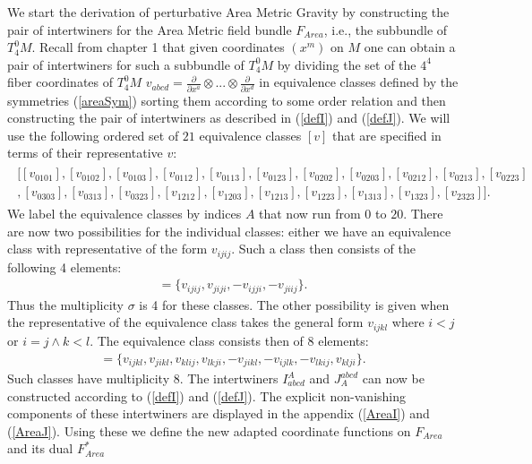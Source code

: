 \documentclass[a4paper,12pt, DIV=14, BCOR=5mm, twoside, headsepline, numbers=noenddot]{scrbook}
\begin{document}
We start the derivation of perturbative Area Metric Gravity by constructing the pair of intertwiners for the Area Metric field bundle $F_{Area}$, i.e., the subbundle of $T^0_4M$. Recall from chapter 1 that given coordinates $(x^m)$ on $M$ one can obtain a pair of intertwiners for such a subbundle of $T^0_4M$ by dividing the set of the $4^4$ fiber coordinates of $T^0_4M$ $v_{abcd}=\frac{\partial}{\partial x^a} \otimes ... \otimes \frac{\partial}{\partial x^d}$ in equivalence classes defined by the symmetries (\ref{areaSym}) sorting them according to some order relation and then constructing the pair of intertwiners as described in (\ref{defI}) and (\ref{defJ}). We will use the following ordered set of $21$ equivalence classes $[v]$ that are specified in terms of their representative $v$:
\begin{align}
\begin{aligned}
    \bigl [ [v_{0101}], [v_{0102}], [v_{0103}], [v_{0112}], [v_{0113}], [v_{0123}], [v_{0202}], [v_{0203}], [v_{0212}], [v_{0213}], [v_{0223}]\\
    , [v_{0303}], [v_{0313}], [v_{0323}], [v_{1212}], [v_{1203}], [v_{1213}], [v_{1223}], [v_{1313}], [v_{1323}], [v_{2323}]  \bigr ].
\end{aligned}
\end{align}
We label the equivalence classes by indices $A$ that now run from $0$ to $20$.
There are now two possibilities for the individual classes: either we have an equivalence class with representative of the form $v_{ijij}$. Such a class then consists of the following 4 elements:
\begin{align}
    [v_{ijij}] = \{ v_{ijij}, v_{jiji}, -v_{ijji}, -v_{jiij} \}.
\end{align}
Thus the multiplicity $\sigma$ is 4 for these classes.
The other possibility is given when the representative of the equivalence class takes the general form $v_{ijkl}$ where $i<j$ or $i=j \land k<l$. The equivalence class consists then of 8 elements:
\begin{align}
    [v_{ijkl}] = \{v_{ijkl},v_{jikl}, v_{klij}, v_{lkji}, -v_{jikl}, -v_{ijlk}, -v_{lkij}, v_{klji} \}.
\end{align}
Such classes have multiplicity 8. The intertwiners $I^A_{abcd}$ and $J_A^{abcd}$ can now be constructed according to (\ref{defI}) and (\ref{defJ}). The explicit non-vanishing components of these intertwiners are displayed in the appendix (\ref{AreaI}) and (\ref{AreaJ}). Using these we define the new adapted coordinate functions on $F_{Area}$ and its dual $F_{Area}^{\ast}$
\end{document}
